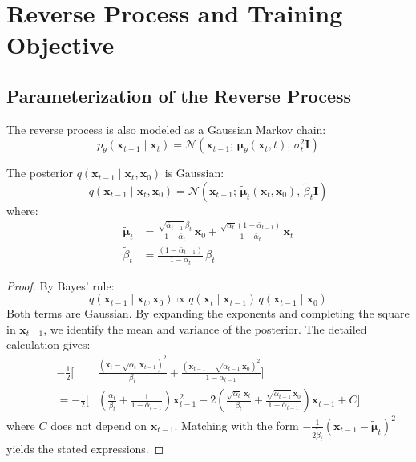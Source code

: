 \section{Reverse Process and Training Objective}
\label{sec:diffusion-reverse}

\subsection{Parameterization of the Reverse Process}

The reverse process is also modeled as a Gaussian Markov chain:
\begin{equation}
p_\theta(\mathbf{x}_{t-1} \mid \mathbf{x}_t) = \mathcal{N}\!\left(\mathbf{x}_{t-1};\, \boldsymbol{\mu}_\theta(\mathbf{x}_t, t),\, \sigma_t^2 \mathbf{I}\right)
\label{eq:reverse-step}
\end{equation}

\begin{theorem}
\label{thm:posterior}
The posterior $q(\mathbf{x}_{t-1} \mid \mathbf{x}_t, \mathbf{x}_0)$ is Gaussian:
\begin{equation}
q(\mathbf{x}_{t-1} \mid \mathbf{x}_t, \mathbf{x}_0) = \mathcal{N}\!\left(\mathbf{x}_{t-1};\, \tilde{\boldsymbol{\mu}}_t(\mathbf{x}_t, \mathbf{x}_0),\, \tilde{\beta}_t \mathbf{I}\right)
\end{equation}
where:
\begin{align}
\tilde{\boldsymbol{\mu}}_t &= \frac{\sqrt{\bar{\alpha}_{t-1}}\,\beta_t}{1 - \bar{\alpha}_t}\,\mathbf{x}_0 + \frac{\sqrt{\alpha_t}(1 - \bar{\alpha}_{t-1})}{1 - \bar{\alpha}_t}\,\mathbf{x}_t \\
\tilde{\beta}_t &= \frac{(1 - \bar{\alpha}_{t-1})}{1 - \bar{\alpha}_t}\,\beta_t
\end{align}
\end{theorem}

\begin{proof}
By Bayes' rule:
\[
q(\mathbf{x}_{t-1} \mid \mathbf{x}_t, \mathbf{x}_0) \propto q(\mathbf{x}_t \mid \mathbf{x}_{t-1})\,q(\mathbf{x}_{t-1} \mid \mathbf{x}_0)
\]
Both terms are Gaussian. By expanding the exponents and completing
the square in $\mathbf{x}_{t-1}$, we identify the mean and variance of the
posterior. The detailed calculation gives:
\begin{align}
-\frac{1}{2}\Bigg[&\frac{(\mathbf{x}_t - \sqrt{\alpha_t}\,\mathbf{x}_{t-1})^2}{\beta_t} + \frac{(\mathbf{x}_{t-1} - \sqrt{\bar{\alpha}_{t-1}}\,\mathbf{x}_0)^2}{1 - \bar{\alpha}_{t-1}}\Bigg] \\
= -\frac{1}{2}\Bigg[&\left(\frac{\alpha_t}{\beta_t} + \frac{1}{1 - \bar{\alpha}_{t-1}}\right)\mathbf{x}_{t-1}^2 - 2\left(\frac{\sqrt{\alpha_t}\,\mathbf{x}_t}{\beta_t} + \frac{\sqrt{\bar{\alpha}_{t-1}}\,\mathbf{x}_0}{1 - \bar{\alpha}_{t-1}}\right)\mathbf{x}_{t-1} + C\Bigg]
\end{align}
where $C$ does not depend on $\mathbf{x}_{t-1}$. Matching with the form
$-\frac{1}{2\tilde{\beta}_t}(\mathbf{x}_{t-1} - \tilde{\boldsymbol{\mu}}_t)^2$
yields the stated expressions.
\end{proof}

